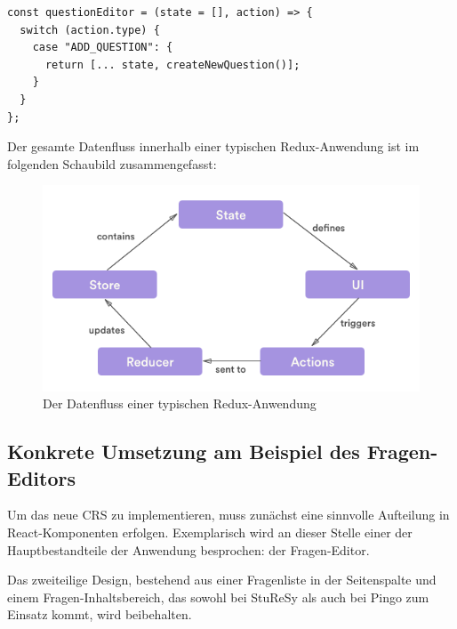 \begin{minipage}{\linewidth}
\begin{lstlisting}[caption={In einem Reducer werden die Änderungsoperationen eines Stores als pure Funktion implementiert.}]
const questionEditor = (state = [], action) => {
  switch (action.type) {
    case "ADD_QUESTION": {
      return [... state, createNewQuestion()];
    }
  }
};
\end{lstlisting}
\end{minipage}

Der gesamte Datenfluss innerhalb einer typischen Redux-Anwendung ist im folgenden Schaubild zusammengefasst:

\begin{figure}[H]
    \includegraphics[width=\textwidth]{chapter/entwurf/bilder/redux_flow.png}
    \centering
    \caption[Datenfluss einer typischen Redux-Anwendung.]{Der Datenfluss einer typischen Redux-Anwendung\protect\footnotemark}
    \label{abb:redux_flow}
\end{figure}



\subsection{Konkrete Umsetzung am Beispiel des Fragen-Editors}
Um das neue CRS zu implementieren, muss zunächst eine sinnvolle Aufteilung in React-Komponenten erfolgen. Exemplarisch wird an dieser Stelle einer der Hauptbestandteile der Anwendung besprochen: der Fragen-Editor.

Das zweiteilige Design, bestehend aus einer Fragenliste in der Seitenspalte und einem Fragen-Inhaltsbereich, das sowohl bei StuReSy als auch bei Pingo zum Einsatz kommt, wird beibehalten.

